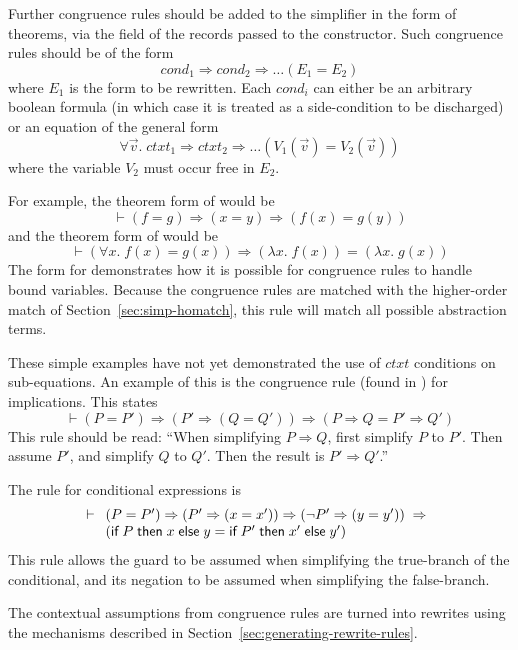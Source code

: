 Further congruence rules should be added to the simplifier in the form
of theorems, via the  field of the records passed to the
 constructor.  Such congruence rules should be of the form
\[
\mathit{cond_1} \Rightarrow \mathit{cond_2} \Rightarrow \dots (E_1 =
E_2)
\]
where $E_1$ is the form to be rewritten.  Each $\mathit{cond}_i$ can
either be an arbitrary boolean formula (in which case it is treated as
a side-condition to be discharged) or an equation of the general form
\[
\forall \vec{v}. \;\mathit{ctxt}_1 \Rightarrow \mathit{ctxt}_2
\Rightarrow \dots (V_1(\vec{v}) = V_2(\vec{v}))
\]
where the variable $V_2$ must occur free in $E_2$.

For example, the theorem form of  would be
\[
\vdash (f = g) \Rightarrow (x = y) \Rightarrow (f(x) = g(y))
\]
and the theorem form of  would be
\[
\vdash (\forall x. \;f (x) = g (x)) \Rightarrow (\lambda x. \;f(x)) = (\lambda
x.\;g(x))
\]
The form for  demonstrates how it is possible for congruence
rules to handle bound variables.  Because the congruence rules are
matched with the higher-order match of Section~\ref{sec:simp-homatch},
this rule will match all possible abstraction terms.

These simple examples have not yet demonstrated the use of
$\mathit{ctxt}$ conditions on sub-equations.  An example of this is
the congruence rule (found in ) for implications.  This
states
\[
\vdash (P = P') \Rightarrow (P' \Rightarrow (Q = Q')) \Rightarrow
(P \Rightarrow Q = P' \Rightarrow Q')
\]
This rule should be read: ``When simplifying $P\Rightarrow Q$, first
simplify $P$ to $P'$.  Then assume $P'$, and simplify $Q$ to $Q'$.
Then the result is $P' \Rightarrow Q'$.''

The rule for conditional expressions is
\[
\vdash \begin{array}[t]{l}
  (P = P') \Rightarrow (P' \Rightarrow (x = x')) \Rightarrow
  (\neg P' \Rightarrow (y = y')) \;\Rightarrow\\
       (\textsf{if}\;P\;\textsf{then}\;x\;\textsf{else}\;y =
       \textsf{if}\;P'\;\textsf{then}\;x'\;\textsf{else}\;y')
\end{array}
\]
This rule allows the guard to be assumed when simplifying the
true-branch of the conditional, and its negation to be assumed when
simplifying the false-branch.

The contextual assumptions from congruence rules are turned into
rewrites using the mechanisms described in
Section~\ref{sec:generating-rewrite-rules}.

